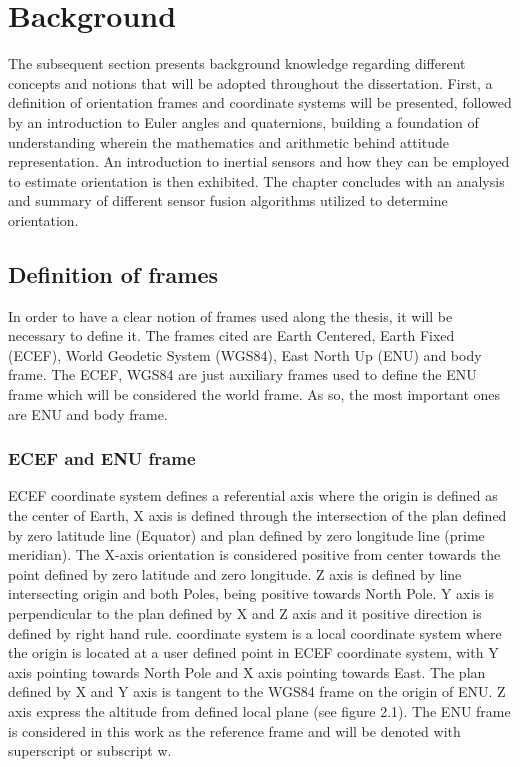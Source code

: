 \section{Background}
The subsequent section presents background knowledge regarding different concepts and notions that will be adopted throughout the dissertation.
First, a definition of orientation frames and coordinate systems will be presented, followed by an introduction to Euler angles and quaternions, building a foundation of understanding wherein the mathematics and arithmetic behind attitude representation. An introduction to inertial sensors and how they can be employed to estimate orientation is then exhibited. The chapter concludes with an analysis and summary of different sensor fusion algorithms utilized to determine orientation.
\subsection{Definition of frames}
In order to have a clear notion of frames used along the thesis, it will be necessary to define it. The
frames cited are Earth Centered, Earth Fixed (ECEF), World Geodetic System (WGS84), East North
Up (ENU) and body frame. The ECEF, WGS84 are just auxiliary frames used to define the ENU frame
which will be considered the world frame. As so, the most important ones are ENU and body frame.
\subsubsection{ECEF and ENU frame}
ECEF coordinate system defines a referential axis where the origin is defined as the center of Earth,
X axis is defined through the intersection of the plan defined by zero latitude line (Equator) and plan
defined by zero longitude line (prime meridian). The X-axis orientation is considered positive from center
towards the point defined by zero latitude and zero longitude. Z axis is defined by line intersecting origin
and both Poles, being positive towards North Pole. Y axis is perpendicular to the plan defined by X and
Z axis and it positive direction is defined by right hand rule.
coordinate system is a local coordinate system where the origin is located at a user defined
point in ECEF coordinate system, with Y axis pointing towards North Pole and X axis pointing towards
East. The plan defined by X and Y axis is tangent to the WGS84 frame on the origin of ENU. Z axis
express the altitude from defined local plane (see figure 2.1). The ENU frame is considered in this work
as the reference frame and will be denoted with superscript or subscript w.
